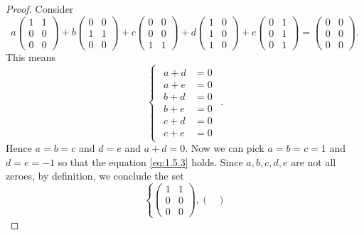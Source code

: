 \begin{Exercise}
	\begin{proof}
		Consider
		\begin{equation}\label{eq:1.5.3}
		a\begin{pmatrix}
		1 & 1 \\
		0 & 0 \\
		0 & 0
		\end{pmatrix} + b\begin{pmatrix}
		0 & 0 \\
		1 & 1 \\
		0 & 0
		\end{pmatrix} + c\begin{pmatrix}
		0 & 0 \\
		0 & 0 \\
		1 & 1
		\end{pmatrix} + d\begin{pmatrix}
		1 & 0 \\
		1 & 0 \\
		1 & 0
		\end{pmatrix} + e\begin{pmatrix}
		0 & 1 \\
		0 & 1 \\
		0 & 1
		\end{pmatrix} = \begin{pmatrix}
		0 & 0 \\
		0 & 0 \\
		0 & 0
		\end{pmatrix}.
		\end{equation}
		This means
		$$
		\begin{cases}
		\begin{aligned}
		a+d &= 0 \\
		a+e &= 0 \\
		b+d &= 0 \\
		b+e &= 0 \\
		c+d &= 0 \\
		c+e &= 0
		\end{aligned}
		\end{cases}.
		$$
		Hence $a=b=c$ and $d=e$ and $a+d=0$. Now we can pick $a=b=c=1$ and $d=e=-1$ so that the equation \eqref{eq:1.5.3} holds. Since $a,b,c,d,e$ are not all zeroes, by definition, we conclude the set
		$$
		\left\{\begin{pmatrix}
		1 & 1 \\
		0 & 0 \\
		0 & 0
		\end{pmatrix} , \begin{pmatrix}

\end{pmatrix}$$
\end{proof}
\end{Exercise}
